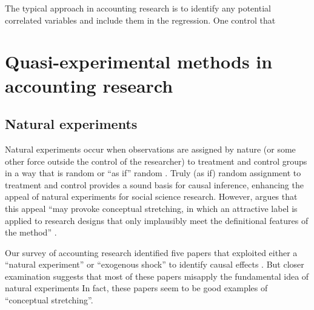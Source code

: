 \documentclass[11pt]{amsart}
\begin{document}
The typical approach in accounting research is to identify any potential correlated variables and include them in the regression.
One control that 






%





\section{Quasi-experimental methods in accounting research}


\subsection{Natural experiments}
Natural experiments occur when observations are assigned by nature (or some other force outside the control of the researcher) to treatment and control groups in a way that is random or ``as if'' random \citep{Dunning:2012tt}. 
Truly (as if) random assignment to treatment and control provides a sound basis for causal inference, enhancing the appeal of natural experiments for social science research.
However, argues that this appeal ``may provoke conceptual stretching, in which an attractive label is applied to research designs that only implausibly meet the definitional features of the method'' \citep[p.3]{Dunning:2012tt}.

Our survey of accounting research identified five papers that exploited either a ``natural experiment'' or ``exogenous shock'' to identify causal effects \citep{Lo:2013jk,Aier:2014ii,Kirk:2014gx,Houston:2014hv,Hail:2014fq}.
But closer examination suggests that most of these papers misapply the fundamental idea of natural experiments  In fact, these papers seem to be good examples of ``conceptual stretching''.
\end{document}
